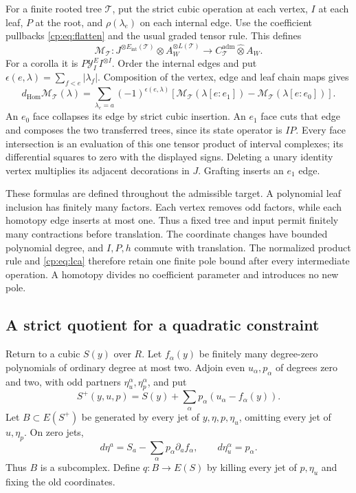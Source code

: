 For a finite rooted tree \(\mathcal T\), put the strict cubic
operation at each vertex, \(I\) at each leaf, \(P\) at the root,
and \(\rho(\lambda_e)\) on each internal edge.  Use the coefficient
pullbacks \eqref{cp:eq:flatten} and the usual graded tensor rule.
This defines
\begin{equation}\label{cp:eq:tree-map}
 \mathcal M_{\mathcal T}:
 J^{\otimes E_{\mathrm{int}}(\mathcal T)}
     \otimes A_W^{\otimes L(\mathcal T)}
 \longrightarrow
 C_{\mathcal T}^{\mathrm{adm}}\widehat\otimes A_W.
\end{equation}
For a corolla it is \(P\mathcal Y_I^E I^{\otimes I}\).
Order the internal edges and put
\(\epsilon(e,\lambda)=\sum_{f<e}|\lambda_f|\).
Composition of the vertex, edge and leaf chain maps gives
\begin{equation}\label{cp:eq:cube}
 d_{\mathrm{Hom}}\mathcal M_{\mathcal T}(\lambda)
 =\sum_{\lambda_e=a}(-1)^{\epsilon(e,\lambda)}
 \left[
 \mathcal M_{\mathcal T}(\lambda[e:e_1])
 -\mathcal M_{\mathcal T}(\lambda[e:e_0])
 \right].
\end{equation}
An \(e_0\) face collapses its edge by strict cubic insertion.
An \(e_1\) face cuts that edge and composes the two transferred
trees, since its state operator is \(IP\).  Every face intersection
is an evaluation of this one tensor product of interval complexes;
its differential squares to zero with the displayed signs.
Deleting a unary identity vertex multiplies its adjacent decorations
in \(J\).  Grafting inserts an \(e_1\) edge.

These formulas are defined throughout the admissible target.
A polynomial leaf inclusion has finitely many factors.  Each vertex
removes odd factors, while each homotopy edge inserts at most one.
Thus a fixed tree and input permit finitely many contractions before
translation.  The coordinate changes have bounded polynomial degree,
and \(I,P,h\) commute with translation.  The normalized product rule
and \eqref{cp:eq:lca} therefore retain one finite pole bound
after every intermediate operation.  A homotopy divides no
coefficient parameter and introduces no new pole.

\subsection{A strict quotient for a quadratic constraint}

Return to a cubic \(S(y)\) over \(R\).  Let \(f_\alpha(y)\)
be finitely many degree-zero polynomials of ordinary degree at most
two.  Adjoin even \(u_\alpha,p_\alpha\) of degrees zero and two,
with odd partners \(\eta_u^\alpha,\eta_p^\alpha\), and put
\begin{equation}\label{cp:eq:extension}
 S^+(y,u,p)
   =S(y)+\sum_\alpha p_\alpha(u_\alpha-f_\alpha(y)).
\end{equation}
Let \(B\subset E(S^+)\) be generated by every jet of
\(y,\eta,p,\eta_u\), omitting every jet of \(u,\eta_p\).
On zero jets,
\[
 d\eta^a=S_a-\sum_\alpha p_\alpha\partial_a f_\alpha,
 \qquad d\eta_u^\alpha=p_\alpha.
\]
Thus \(B\) is a subcomplex.  Define \(q:B\to E(S)\) by killing
every jet of \(p,\eta_u\) and fixing the old coordinates.

